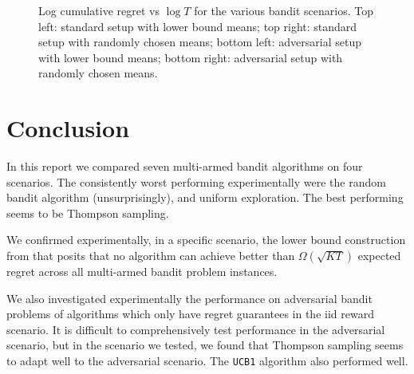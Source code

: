 \documentclass[10pt]{article}
\begin{document}
\begin{figure}[!ht]
\begin{tabular}{cc}
    \end{tabular}
    \caption{Log cumulative regret vs $\log T$ for the various bandit scenarios.
    Top left: standard setup with lower bound means; top right: standard setup
    with randomly chosen means; bottom left: adversarial setup with lower bound
    means; bottom right: adversarial setup with randomly chosen means.}
    \label{figure-graphs}
\end{figure}

\section{Conclusion}
In this report we compared seven multi-armed bandit algorithms on four
scenarios. The consistently worst performing experimentally were the random
bandit algorithm (unsurprisingly), and uniform exploration. The best performing
seems to be Thompson sampling.

We confirmed experimentally, in a specific scenario, the lower bound
construction from \cite{Slivkins} that posits that no algorithm can achieve
better than $\Omega(\sqrt{KT})$ expected regret across all multi-armed bandit
problem instances.

We also investigated experimentally the performance on adversarial bandit
problems of algorithms which only have regret guarantees in the iid reward
scenario. It is difficult to comprehensively test performance in the adversarial
scenario, but in the scenario we tested, we found that Thompson sampling seems
to adapt well to the adversarial scenario. The \verb'UCB1' algorithm also
performed well.



\end{document}
